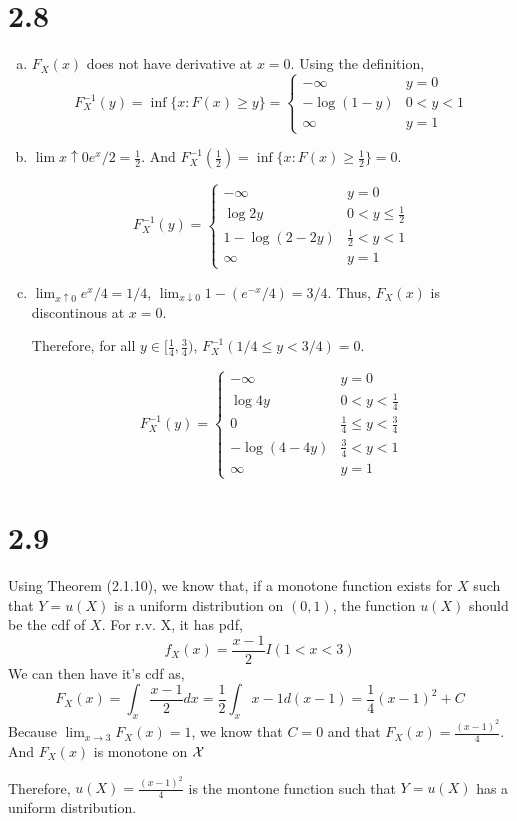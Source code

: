 \documentclass[letterpaper]{article}
\newcommand{\cX}{\cal{X}}
\begin{document}
    \section*{2.8}
    \begin{enumerate}[(a)]
    \item $F_X(x)$ does not have derivative at $x=0$. Using the definition, 
    \[
    F^{-1}_X(y) = \inf\{x: F(x) \geq y\} = \begin{cases}
    -\infty & y=0\\
    -\log(1-y) & 0 < y < 1\\
    \infty & y = 1
    \end{cases}
    \]
    \item $\lim{x \uparrow 0} e^x/2 = \frac{1}{2}$.
    And $F^{-1}_X(\frac{1}{2}) = \inf\{x: F(x) \geq \frac{1}{2}\} = 0$.

    \[
    F^{-1}_X(y) = \begin{cases}
    -\infty & y = 0 \\
    \log 2y & 0 < y \leq \frac{1}{2} \\
    1-\log(2-2y) &  \frac{1}{2} < y < 1 \\
    \infty & y = 1
    \end{cases}
    \]

    \item $\lim_{x \uparrow 0} e^x/4 = 1/4$, 
    $\lim_{x \downarrow 0} 1-(e^{-x}/4) = 3/4$. Thus, $F_X(x)$ is discontinous
    at $x=0$.
    
    Therefore, for all $y \in [\frac{1}{4}, \frac{3}{4})$, 
    $F^{-1}_X(1/4 \leq y < 3/4) = 0$.

    \[
    F^{-1}_X(y) = \begin{cases}
    -\infty & y = 0 \\
    \log 4y & 0 < y < \frac{1}{4} \\
    0 & \frac{1}{4} \leq y < \frac{3}{4} \\
    -\log (4-4y) & \frac{3}{4} < y < 1 \\
    \infty & y = 1
    \end{cases}
    \]
    \end{enumerate}
    
    \section*{2.9}
    Using Theorem (2.1.10), we know that, if a monotone function exists for $X$
    such that $Y=u(X)$ is a uniform distribution on $(0,1)$, the function
    $u(X)$ should be the cdf of $X$.
    For r.v. X, it has pdf,
    \[
    f_X(x) = \frac{x-1}{2} I(1 < x < 3)
    \]
    We can then have it's cdf as,
    \[
    F_X(x) = \int_x \frac{x-1}{2} dx = \frac{1}{2} \int_x x-1 d(x-1) = \frac{1}{4}
    (x-1)^2 + C
    \]
    Because $\lim_{x \to 3} F_X(x) = 1$, we know that $C=0$ and 
    that $F_X(x) = \frac{(x-1)^2}{4}$. And $F_X(x)$ is monotone on $\cX$

    Therefore, $u(X) = \frac{(x-1)^2}{4}$ is the montone function such that
    $Y=u(X)$ has a uniform distribution.
\end{document}
